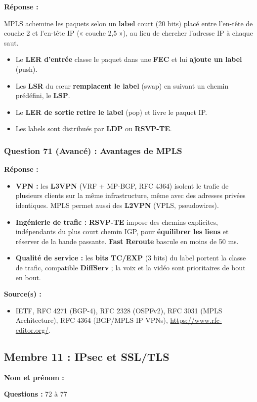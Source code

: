 \documentclass[12pt,a4paper]{article}
\newcommand{\membre}[2]{%
  \textbf{Nom et prénom :} #1 \par
  \textbf{Questions :} #2 \par
}
\newcommand{\reponse}{\textbf{Réponse :}\par}
\newcommand{\sources}{\textbf{Source(s) :}}
\begin{document}
\reponse
MPLS achemine les paquets selon un \textbf{label} court (20 bits) placé
entre l'en-tête de couche 2 et l'en-tête IP (« couche 2,5 »), au lieu
de chercher l'adresse IP à chaque saut.
\begin{itemize}
    \item Le \textbf{LER d'entrée} classe le paquet dans une
    \textbf{FEC} et lui \textbf{ajoute un label} (push).
    \item Les \textbf{LSR} du cœur \textbf{remplacent le label} (swap)
    en suivant un chemin prédéfini, le \textbf{LSP}.
    \item Le \textbf{LER de sortie} \textbf{retire le label} (pop) et
    livre le paquet IP.
    \item Les labels sont distribués par \textbf{LDP} ou
    \textbf{RSVP-TE}.
\end{itemize}

\subsubsection*{Question 71 (Avancé) : Avantages de MPLS}

\reponse
\begin{itemize}
    \item \textbf{VPN :} les \textbf{L3VPN} (VRF + MP-BGP, RFC 4364)
    isolent le trafic de plusieurs clients sur la même infrastructure,
    même avec des adresses privées identiques. MPLS permet aussi des
    \textbf{L2VPN} (VPLS, pseudowires).
    \item \textbf{Ingénierie de trafic :} \textbf{RSVP-TE} impose des
    chemins explicites, indépendants du plus court chemin IGP, pour
    \textbf{équilibrer les liens} et réserver de la bande passante.
    \textbf{Fast Reroute} bascule en moins de 50 ms.
    \item \textbf{Qualité de service :} les \textbf{bits TC/EXP} (3 bits)
    du label portent la classe de trafic, compatible
    \textbf{DiffServ} ; la voix et la vidéo sont prioritaires de bout en
    bout.
\end{itemize}

\sources
\begin{itemize}
    \item IETF, RFC 4271 (BGP-4), RFC 2328 (OSPFv2), RFC 3031 (MPLS
    Architecture), RFC 4364 (BGP/MPLS IP VPNs),
    \url{https://www.rfc-editor.org/}.
\end{itemize}

\subsection{Membre 11 : IPsec et SSL/TLS}
\membre{\dotfill}{72 à 77}
\end{document}
